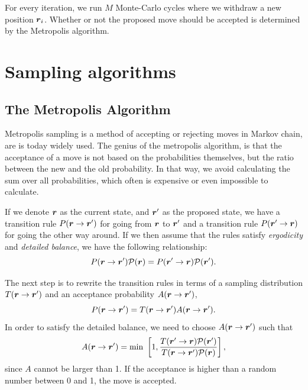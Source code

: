 For every iteration, we run $M$ Monte-Carlo cycles where we withdraw a new position $\boldsymbol{{r}}_i$. Whether or not the proposed move should be accepted is determined by the Metropolis algorithm.

\section{Sampling algorithms}
\subsection{The Metropolis Algorithm}
Metropolis sampling is a method of accepting or rejecting moves in Markov chain, are is today widely used. The genius of the metropolis algorithm, is that the acceptance of a move is not based on the probabilities themselves, but the ratio between the new and the old probability. In that way, we avoid calculating the sum over all probabilities, which often is expensive or even impossible to calculate. 

If we denote $\boldsymbol{{r}}$ as the current state, and $\boldsymbol{{r}}'$ as the proposed state, we have a transition rule $P(\boldsymbol{{r}}\rightarrow\boldsymbol{{r}}')$ for going from $\boldsymbol{{r}}$ to $\boldsymbol{{r}}'$ and a transition rule $P(\boldsymbol{{r}}'\rightarrow\boldsymbol{{r}})$ for going the other way around. If we then assume that the rules satisfy \textit{ergodicity} and \textit{detailed balance}, we have the following relationship:
\begin{equation}
P(\boldsymbol{{r}}\rightarrow\boldsymbol{{r}}')\mathcal{P}(\boldsymbol{{r}})=P(\boldsymbol{{r}}'\rightarrow\boldsymbol{{r}})\mathcal{P}(\boldsymbol{{r}}').
\end{equation}

The next step is to rewrite the transition rules in terms of a sampling distribution $T(\boldsymbol{{r}}\rightarrow\boldsymbol{{r}}')$ and an acceptance probability $A(\boldsymbol{{r}}\rightarrow\boldsymbol{{r}}')$,
\begin{equation}
P(\boldsymbol{{r}}\rightarrow\boldsymbol{{r}}')=T(\boldsymbol{{r}}\rightarrow\boldsymbol{{r}}')A(\boldsymbol{{r}}\rightarrow\boldsymbol{{r}}').
\end{equation}
In order to satisfy the detailed balance, we need to choose $A(\boldsymbol{{r}}\rightarrow\boldsymbol{{r}}')$ such that
\begin{equation}
A(\boldsymbol{{r}}\rightarrow\boldsymbol{{r}}')=\text{min }\left[1,\frac{T(\boldsymbol{{r}}'\rightarrow\boldsymbol{{r}})\mathcal{P}(\boldsymbol{{r}}')}{T(\boldsymbol{{r}}\rightarrow\boldsymbol{{r}}')\mathcal{P}(\boldsymbol{{r}})}\right],
\end{equation}
since $A$ cannot be larger than 1. If the acceptance is higher than a random number between 0 and 1, the move is accepted.

